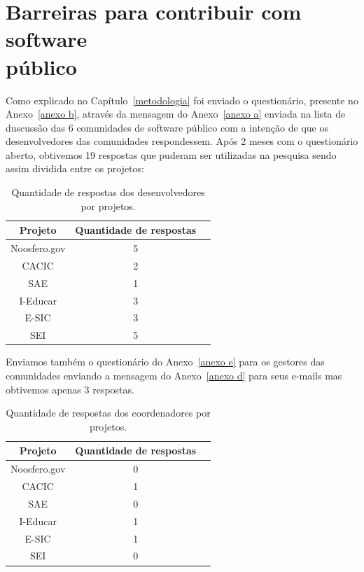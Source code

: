 \chapter{Barreiras para contribuir com software \\público}
\label{barreiras_publico}

Como explicado no Capítulo~\ref{metodologia} foi enviado o questionário, 
presente no Anexo~\ref{anexo b}, através da mensagem do Anexo~\ref{anexo a} 
enviada na lista de duscussão das 6 comunidades de software público com 
a intenção de que os desenvolvedores das comunidades respondessem. Após 2 
meses com o questionário aberto, obtivemos 19 respostas que puderam ser 
utilizadas na pesquisa sendo assim dividida entre os projetos:

\begin{table}[h]
	\centering
	\label{tab01}
	
	\begin{tabular}{ccc}
		\toprule
		\textbf{Projeto} & \textbf{Quantidade de respostas} \\
		\midrule
		Noosfero.gov & 5 \\
		CACIC & 2 \\
		SAE & 1 \\
		I-Educar & 3 \\
		E-SIC & 3 \\
		SEI & 5 \\
		\bottomrule
	\end{tabular}

	\caption{Quantidade de respostas dos desenvolvedores por projetos.}
\end{table}
  

Enviamos também o questionário do Anexo~\ref{anexo e} para os gestores das 
comunidades enviando a mensagem do Anexo~\ref{anexo d} para seus e-mails mas 
obtivemos apenas 3 respostas.

\begin{table}[h]
	\centering
	\label{tab01}
	
	\begin{tabular}{ccc}
		\toprule
		\textbf{Projeto} & \textbf{Quantidade de respostas} \\
		\midrule
		Noosfero.gov & 0 \\
		CACIC & 1 \\
		SAE & 0 \\
		I-Educar & 1 \\
		E-SIC & 1 \\
		SEI & 0 \\
		\bottomrule
	\end{tabular}

	\caption{Quantidade de respostas dos coordenadores por projetos.}
\end{table}



